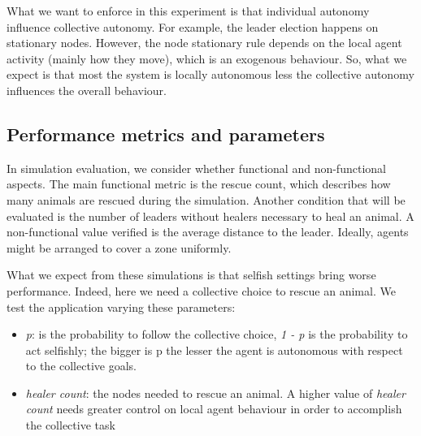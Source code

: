 What we want to enforce in this experiment 
 is that individual autonomy influence collective autonomy.
%
For example, the leader election happens on stationary nodes. 
 However, the node stationary rule depends on the local agent 
 activity (mainly how they move), which is an exogenous behaviour.
%
So, what we expect is that most the system is locally autonomous less 
 the collective autonomy influences the overall behaviour.
%
%
\subsection{Performance metrics and parameters} \label{mdpi2020:sb:performance}

In simulation evaluation, we consider whether 
 functional and non-functional aspects.
%
The main functional metric is the rescue count, 
 which describes how many animals are rescued 
 during the simulation. 
%
Another condition that will be evaluated 
 is the number of leaders without healers 
 necessary to heal an animal. 
%
A non-functional value verified is the average distance to the leader.
 Ideally, agents might be arranged to cover a zone uniformly.
% 

%
What we expect from these simulations is that selfish settings 
 bring worse performance. Indeed, here we need a collective 
 choice to rescue an animal. 
%
We test the application varying these parameters:
\begin{itemize}
  \item \emph{p}: is the probability to follow the collective choice, \emph{1 - p} 
  is the probability to act selfishly;
  the bigger is p the lesser the agent is autonomous with respect to the collective goals.
  \item \emph{healer count}: the nodes needed to rescue an animal. A higher value of
  \emph{healer count} needs greater control on local agent behaviour in order to accomplish
  the collective task 
\end{itemize}
%
